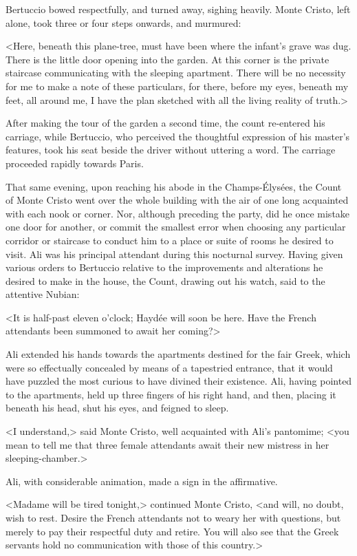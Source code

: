  Bertuccio bowed respectfully, and turned away, sighing heavily. Monte Cristo, left alone, took three or four steps onwards, and murmured: 

 <Here, beneath this plane-tree, must have been where the infant's grave was dug. There is the little door opening into the garden. At this corner is the private staircase communicating with the sleeping apartment. There will be no necessity for me to make a note of these particulars, for there, before my eyes, beneath my feet, all around me, I have the plan sketched with all the living reality of truth.> 

 After making the tour of the garden a second time, the count re-entered his carriage, while Bertuccio, who perceived the thoughtful expression of his master's features, took his seat beside the driver without uttering a word. The carriage proceeded rapidly towards Paris. 

 That same evening, upon reaching his abode in the Champs-Élysées, the Count of Monte Cristo went over the whole building with the air of one long acquainted with each nook or corner. Nor, although preceding the party, did he once mistake one door for another, or commit the smallest error when choosing any particular corridor or staircase to conduct him to a place or suite of rooms he desired to visit. Ali was his principal attendant during this nocturnal survey. Having given various orders to Bertuccio relative to the improvements and alterations he desired to make in the house, the Count, drawing out his watch, said to the attentive Nubian: 

 <It is half-past eleven o'clock; Haydée will soon be here. Have the French attendants been summoned to await her coming?> 

 Ali extended his hands towards the apartments destined for the fair Greek, which were so effectually concealed by means of a tapestried entrance, that it would have puzzled the most curious to have divined their existence. Ali, having pointed to the apartments, held up three fingers of his right hand, and then, placing it beneath his head, shut his eyes, and feigned to sleep. 

 <I understand,> said Monte Cristo, well acquainted with Ali's pantomime; <you mean to tell me that three female attendants await their new mistress in her sleeping-chamber.> 

 Ali, with considerable animation, made a sign in the affirmative. 

 <Madame will be tired tonight,> continued Monte Cristo, <and will, no doubt, wish to rest. Desire the French attendants not to weary her with questions, but merely to pay their respectful duty and retire. You will also see that the Greek servants hold no communication with those of this country.> 

